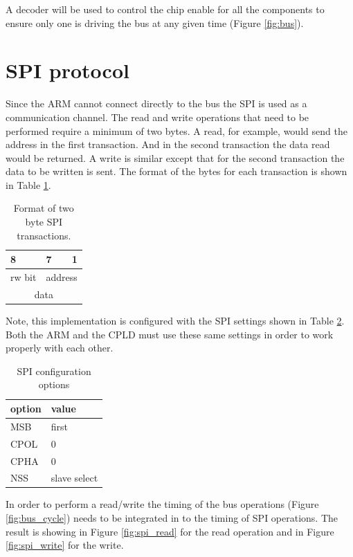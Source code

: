 \documentclass{article}
\begin{document}
A decoder will be used to control the chip enable for all the components
to ensure only one is driving the bus at any given time (Figure \ref{fig:bus}).


\section{SPI protocol}
\label{sec:spi}

Since the ARM cannot connect directly to the bus the SPI
is used as a communication channel.
The read and write operations that need to be performed
require a minimum of two bytes.
A read, for example, would send the address in the first transaction.
And in the second transaction the data read would be returned.
A write is similar except that for the second transaction the
data to be written is sent.
The format of the bytes for each transaction is shown in Table \ref{tbl:spiformat}.

\begin{table}[hbp]
\center
\begin{tabular}{|c|c|c|}
    \multicolumn{1}{l}{8} & \multicolumn{1}{l}{7} & \multicolumn{1}{r}{1} \\
\hline
rw bit & \multicolumn{2}{|c|}{address} \\
\hline
\multicolumn{3}{|c|}{data} \\
\hline
\end{tabular}
\caption{Format of two byte SPI transactions.}
\label{tbl:spiformat}
\end{table}

Note, this implementation is configured with the SPI settings
shown in Table \ref{tbl:spi}.
Both the ARM and the CPLD must use these same settings in order
to work properly with each other.

\begin{table}
\center
\begin{tabular}{|l|l|}
	\hline
	option & value \\
	\hline
	MSB & first \\
	CPOL & 0 \\
	CPHA & 0 \\
	NSS & slave select\\
	\hline
\end{tabular}
\caption{SPI configuration options}
\label{tbl:spi}
\end{table}

In order to perform a read/write the timing of the bus operations
(Figure \ref{fig:bus_cycle}) needs to be integrated in to the
timing of SPI operations.
The result is showing in Figure \ref{fig:spi_read} for the
read operation and in Figure \ref{fig:spi_write} for the write.
\end{document}
